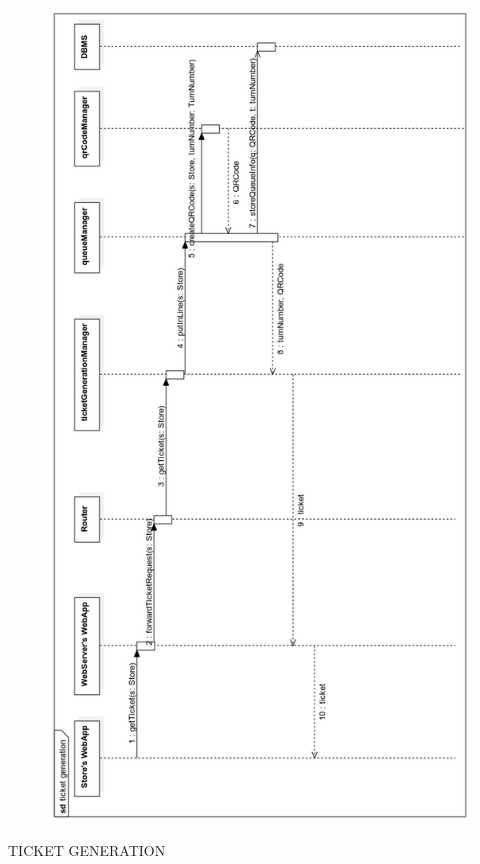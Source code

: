 \documentclass{article}
\begin{document}
\begin{figure}[H]
  \includegraphics[width=\linewidth]{ticketRT.png}
  
\end{figure}
TICKET GENERATION\\
\end{document}
